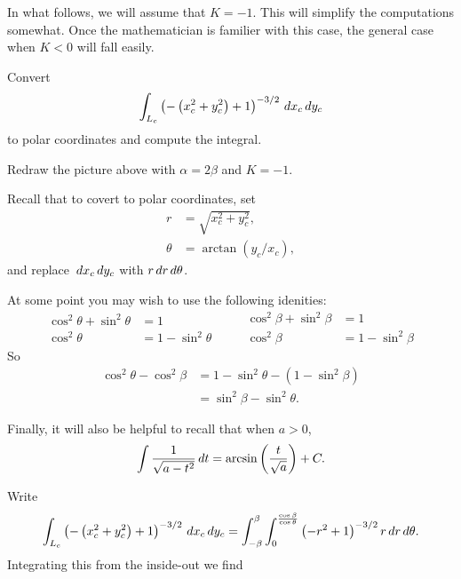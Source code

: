 \documentclass{ximera}
\begin{document}
In what follows, we will assume that $K=-1$. This will simplify the
computations somewhat. Once the mathematician is familier with this
case, the general case when $K<0$ will fall easily.


\begin{problem}
  Convert
  \[
  \int_{L_c} \left(-\left(x_c^2+y_c^2\right)+1\right)^{-3/2} \,d x_c\,d y_c
  \]
  to polar coordinates and compute the integral.
  \begin{hint}
    Redraw the picture above with $\alpha = 2\beta$ and $K=-1$.
  \end{hint}
  \begin{hint}
    Recall that to covert to polar coordinates, set
    \begin{align*}
      r &= \sqrt{x_c^2+y_c^2},\\
      \theta &= \arctan(y_c/x_c),
    \end{align*}
    and replace $\,d x_c\,d y_c$ with $r\,d r\,d \theta$.
  \end{hint}
  \begin{hint}
    At some point you may wish to use the following idenities:
    \[
    \begin{split}
      \cos^2\theta + \sin^2\theta &=1\\
      \cos^2\theta &= 1-\sin^2\theta
    \end{split}
    \qquad
    \begin{split}
      \cos^2\beta + \sin^2\beta &=1\\
      \cos^2\beta &= 1-\sin^2\beta
    \end{split}
    \]
    So
    \begin{align*}
      \cos^2\theta - \cos^2\beta &= 1 - \sin^2\theta - \left(1-\sin^2\beta\right)\\
      &= \sin^2\beta - \sin^2\theta.       
    \end{align*}
  \end{hint}
  \begin{hint}
    Finally, it will also be helpful to recall that when $a>0$,
    \[
    \int \frac{1}{\sqrt{a - t^2}} \,d t = \arcsin\left(\frac{t}{\sqrt{a}}\right) + C.
    \]
  \end{hint}
  \begin{freeResponse}
    Write
    \[
    \int_{L_c} \left(-\left(x_c^2+y_c^2\right)+1\right)^{-3/2} \,d x_c\,d y_c
    = \int_{-\beta}^\beta \int_0^{\frac{\cos \beta}{\cos\theta}}\left(-r^2+1\right)^{-3/2} r\,d r\,d \theta.
    \]
    Integrating this from the inside-out we find
    \begin{align*}

\end{align*}
\end{freeResponse}
\end{problem}
\end{document}
